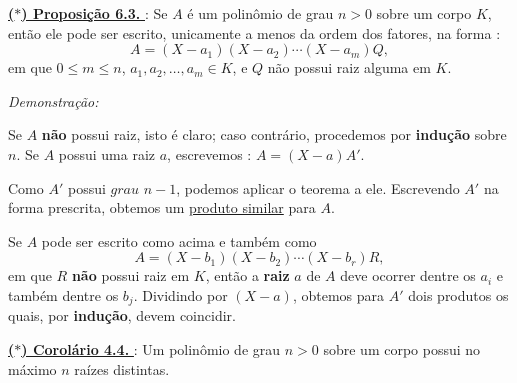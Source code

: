 \vspace{0.2cm}

\noindent\underline{\underline{\textbf{($\ast$) Proposição 6.3. }}} : Se $A$ é um polinômio de grau $n > 0$ sobre um corpo $K$, então ele pode ser escrito,
unicamente a menos da ordem dos fatores, na forma :
\[
A = (X - a_{1})(X - a_{2}) \cdots (X - a_{m})Q,
\]
em que $0 \leq m \leq n$, $a_{1}, a_{2}, \ldots, a_{m} \in K$, e $Q$ não possui raiz alguma em $K$.

\vspace{0.2cm}
\noindent\textit{Demonstração:}  

Se $A$ \textbf{não} possui raiz, isto é claro; caso contrário, procedemos por \textbf{indução} sobre $n$.  
Se $A$ possui uma raiz $a$, escrevemos : $A = (X - a)A'$.

Como $A'$ possui $grau$ $n - 1$, podemos aplicar o teorema a ele.  
Escrevendo $A'$ na forma prescrita, obtemos um \underline{produto similar} para $A$.

Se $A$ pode ser escrito como acima e também como
\[
A = (X - b_{1})(X - b_{2}) \cdots (X - b_{r})R,
\]
em que $R$ \textbf{não} possui raiz em $K$, então a \textbf{raiz} $a$ de $A$ deve ocorrer dentre os $a_i$ e também dentre os $b_j$.  
Dividindo por $(X - a)$, obtemos para $A'$ dois produtos os quais, por \textbf{indução}, devem coincidir.

\vspace{0.3cm}
\noindent\underline{\underline{\textbf{($\ast$) Corolário 4.4. }}} :
Um polinômio de grau $n > 0$ sobre um corpo possui no máximo $n$ raízes distintas.
